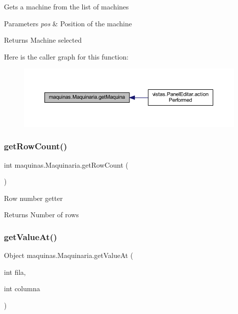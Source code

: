 Gets a machine from the list of machines 
\begin{DoxyParams}{Parameters}
{\em pos} & Position of the machine \\
\hline
\end{DoxyParams}
\begin{DoxyReturn}{Returns}
Machine selected 
\end{DoxyReturn}
Here is the caller graph for this function\+:
\nopagebreak
\begin{figure}[H]
\begin{center}
\leavevmode
\includegraphics[width=350pt]{classmaquinas_1_1_maquinaria_a438161cbcee58e47e57c1c1f0d0207eb_icgraph}
\end{center}
\end{figure}
\mbox{\label{classmaquinas_1_1_maquinaria_aeceaddd786b36d5be354b8e9a581caa3}} 
\subsubsection{\texorpdfstring{get\+Row\+Count()}{getRowCount()}}
{\footnotesize\ttfamily int maquinas.\+Maquinaria.\+get\+Row\+Count (\begin{DoxyParamCaption}{ }\end{DoxyParamCaption})}

Row number getter \begin{DoxyReturn}{Returns}
Number of rows 
\end{DoxyReturn}
\mbox{\label{classmaquinas_1_1_maquinaria_a0fa4ffa21f2f3cc2386634fb4c8b810e}} 
\subsubsection{\texorpdfstring{get\+Value\+At()}{getValueAt()}}
{\footnotesize\ttfamily Object maquinas.\+Maquinaria.\+get\+Value\+At (\begin{DoxyParamCaption}\item[{int}]{fila,  }\item[{int}]{columna }\end{DoxyParamCaption})}

